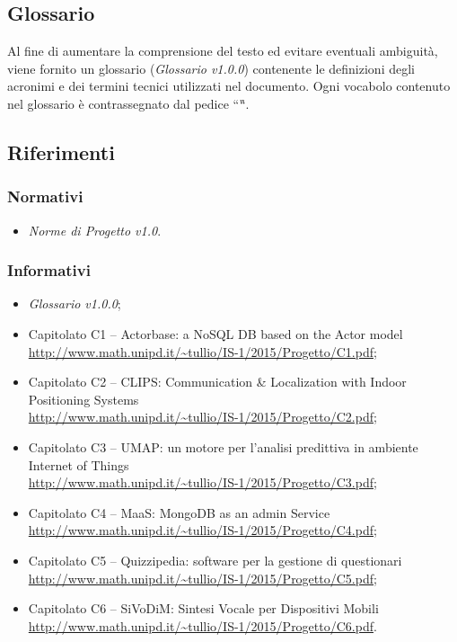 \subsection{Glossario}
Al fine di aumentare la comprensione del testo ed evitare eventuali ambiguità, 
viene fornito un glossario (\textit{Glossario v1.0.0}) contenente le 
definizioni degli acronimi e dei termini tecnici utilizzati nel documento. Ogni 
vocabolo contenuto nel glossario è contrassegnato dal pedice “\G “.

\subsection{Riferimenti}

\subsubsection{Normativi}
\begin{itemize}
\item \textit{Norme di Progetto v1.0}.
\end{itemize}

\subsubsection{Informativi}
\begin{itemize}
\item \textit{Glossario v1.0.0};
\item Capitolato C1 – Actorbase: a NoSQL DB based on the Actor model\\
\url{http://www.math.unipd.it/~tullio/IS-1/2015/Progetto/C1.pdf};
\item Capitolato C2 – CLIPS: Communication \& Localization with Indoor 
Positioning Systems \\ 
\url{http://www.math.unipd.it/~tullio/IS-1/2015/Progetto/C2.pdf};
\item Capitolato C3 – UMAP: un motore per l'analisi predittiva in ambiente Internet of Things\\ \url{http://www.math.unipd.it/~tullio/IS-1/2015/Progetto/C3.pdf};
\item Capitolato C4 – MaaS: MongoDB as an admin Service\\ 
\url{http://www.math.unipd.it/~tullio/IS-1/2015/Progetto/C4.pdf};
\item Capitolato C5 – Quizzipedia: software per la gestione di questionari\\
\url{http://www.math.unipd.it/~tullio/IS-1/2015/Progetto/C5.pdf};
\item Capitolato C6 – SiVoDiM: Sintesi Vocale per Dispositivi Mobili\\ 
\url{http://www.math.unipd.it/~tullio/IS-1/2015/Progetto/C6.pdf}.

\end{itemize}

\newpage


